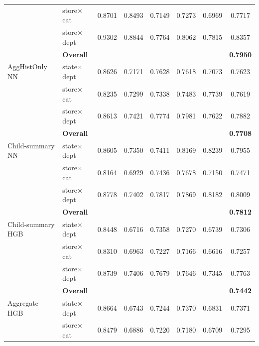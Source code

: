 \begin{table}[H]
\begin{threeparttable}
\begin{tabular}{llccccc|c}
                                   & store$\times$cat       &   0.8701 &   0.8493 &   0.7149 &   0.7273 &   0.6969 &   0.7717 \\
                                   & store$\times$dept      &   0.9302 &   0.8844 &   0.7764 &   0.8062 &   0.7815 &   0.8357 \\
                                   & {\bf Overall} & & & & & & {\bf 0.7950} \\
      \addlinespace
      AggHistOnly NN               & state$\times$dept      &   0.8626 &   0.7171 &   0.7628 &   0.7618 &   0.7073 &   0.7623 \\
                                   & store$\times$cat       &   0.8235 &   0.7299 &   0.7338 &   0.7483 &   0.7739 &   0.7619 \\
                                   & store$\times$dept      &   0.8613 &   0.7421 &   0.7774 &   0.7981 &   0.7622 &   0.7882 \\
                                   & {\bf Overall} & & & & & & {\bf 0.7708} \\
      \addlinespace
      Child-summary NN             & state$\times$dept      &   0.8605 &   0.7350 &   0.7411 &   0.8169 &   0.8239 &   0.7955 \\
                                   & store$\times$cat       &   0.8164 &   0.6929 &   0.7436 &   0.7678 &   0.7150 &   0.7471 \\
                                   & store$\times$dept      &   0.8778 &   0.7402 &   0.7817 &   0.7869 &   0.8182 &   0.8009 \\
                                   & {\bf Overall} & & & & & & {\bf 0.7812} \\
      \addlinespace
      Child-summary HGB            & state$\times$dept      &   0.8448 &   0.6716 &   0.7358 &   0.7270 &   0.6739 &   0.7306 \\
                                   & store$\times$cat       &   0.8310 &   0.6963 &   0.7227 &   0.7166 &   0.6616 &   0.7257 \\
                                   & store$\times$dept      &   0.8739 &   0.7406 &   0.7679 &   0.7646 &   0.7345 &   0.7763 \\
                                   & {\bf Overall} & & & & & & {\bf 0.7442} \\
      \addlinespace
      Aggregate HGB                & state$\times$dept      &   0.8664 &   0.6743 &   0.7244 &   0.7370 &   0.6831 &   0.7371 \\
                                   & store$\times$cat       &   0.8479 &   0.6886 &   0.7220 &   0.7180 &   0.6709 &   0.7295 \\

\end{tabular}
\end{threeparttable}
\end{table}
